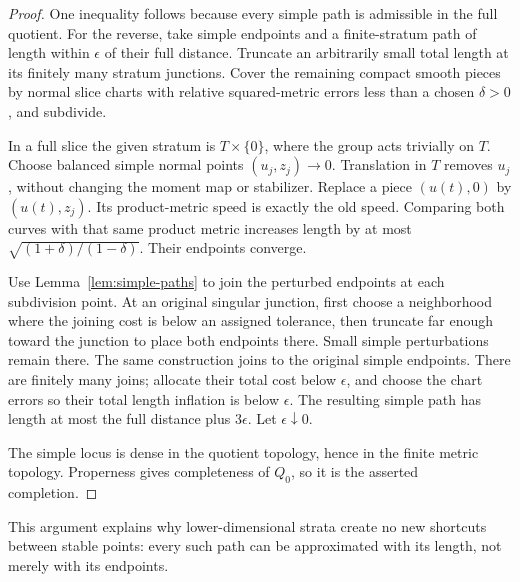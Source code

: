 \begin{proof}
One inequality follows because every simple path is admissible
in the full quotient. For the reverse, take simple endpoints and
a finite-stratum path of length within \(\epsilon\) of their full
distance. Truncate an arbitrarily small total length at its finitely
many stratum junctions. Cover the remaining compact smooth pieces
by normal slice charts with relative squared-metric errors less
than a chosen \(\delta>0\), and subdivide.

In a full slice the given stratum is \(T\times\{0\}\), where the
group acts trivially on \(T\). Choose balanced simple normal points
\((u_j,z_j)\to0\). Translation in \(T\) removes \(u_j\), without
changing the moment map or stabilizer. Replace a piece
\((u(t),0)\) by \((u(t),z_j)\). Its product-metric speed is exactly
the old speed. Comparing both curves with that same product metric
increases length by at most
\(\sqrt{(1+\delta)/(1-\delta)}\). Their endpoints converge.

Use Lemma~\ref{lem:simple-paths} to join the perturbed endpoints
at each subdivision point. At an original singular junction,
first choose a neighborhood where the joining cost is below an
assigned tolerance, then truncate far enough toward the junction
to place both endpoints there. Small simple perturbations remain
there. The same construction joins to the original simple endpoints.
There are finitely many joins; allocate their total cost below
\(\epsilon\), and choose the chart errors so their total length
inflation is below \(\epsilon\).
The resulting simple path has length at most the full distance
plus \(3\epsilon\). Let \(\epsilon\downarrow0\).

The simple locus is dense in the quotient topology, hence in the
finite metric topology. Properness gives completeness of \(Q_0\),
so it is the asserted completion.
\end{proof}

This argument explains why lower-dimensional strata create no
new shortcuts between stable points: every such path can be
approximated with its length, not merely with its endpoints.
